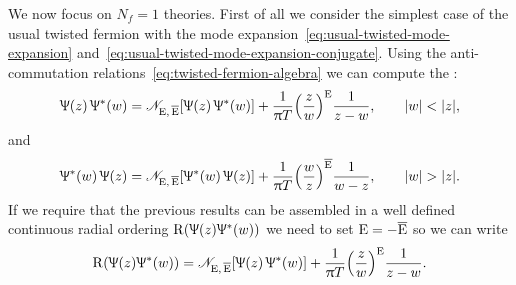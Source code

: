 We now focus on $N_f = 1$ theories.
First of all we consider the simplest case of the usual twisted fermion with the mode expansion~\eqref{eq:usual-twisted-mode-expansion} and~\eqref{eq:usual-twisted-mode-expansion-conjugate}.
Using the anti-commutation relations~\eqref{eq:twisted-fermion-algebra} we can compute the \ope:
\begin{equation}
  \Uppsi( z )\, \Uppsi^*( w )
  =
  \mathscr{N}_{\mathrm{E},\, \overline{\mathrm{E}}}\qty[  \Uppsi( z )\, \Uppsi^*( w )  ]
  +
  \frac{1}{\uppi T} \qty( \frac{z}{w} )^{\mathrm{E}} \frac{1}{z - w},
  \qquad
  \abs{w} < \abs{z},
\end{equation}
and
\begin{equation}
  \Uppsi^*( w )\, \Uppsi( z )
  =
  \mathscr{N}_{\mathrm{E},\, \overline{\mathrm{E}}}\qty[  \Uppsi^*( w )\, \Uppsi( z )  ]
  +
  \frac{1}{\uppi T} \qty( \frac{w}{z} )^{\overline{\mathrm{E}}} \frac{1}{w - z},
  \qquad
  \abs{w} > \abs{z}.
\end{equation}
If we require that the previous results can be assembled in a well defined continuous radial ordering $\mathrm{R}\qty( \Uppsi( z ) \Uppsi^*( w ) )$ we need to set $\mathrm{E} = -\overline{\mathrm{E}}$ so we can write
\begin{equation}
  \mathrm{R}\qty( \Uppsi( z ) \Uppsi^*( w ) )
  =
  \mathscr{N}_{\mathrm{E},\, \overline{\mathrm{E}}}\qty[  \Uppsi( z )\, \Uppsi^*( w )  ]
  +
  \frac{1}{\uppi T} \qty( \frac{z}{w} )^{\mathrm{E}} \frac{1}{z - w}.
\end{equation}


